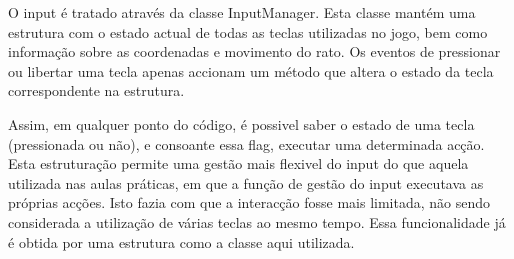 O input é tratado através da classe InputManager. Esta classe mantém uma estrutura com o estado actual de todas as teclas utilizadas no jogo, bem como informação sobre as coordenadas e movimento do rato. Os eventos de pressionar ou libertar uma tecla apenas accionam um método que altera o estado da tecla correspondente na estrutura.

Assim, em qualquer ponto do código, é possivel saber o estado de uma tecla (pressionada ou não), e consoante essa flag, executar uma determinada acção. Esta estruturação permite uma gestão mais flexivel do input do que aquela utilizada nas aulas práticas, em que a função de gestão do input executava as próprias acções. Isto fazia com que a interacção fosse mais limitada, não sendo considerada a utilização de várias teclas ao mesmo tempo. Essa funcionalidade já é obtida por uma estrutura como a classe aqui utilizada.
